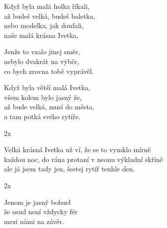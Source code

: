 
\ve
Když byla malá holka říkali, \\
až budeš velká, budeš baletka, \\
nebo modelka, jak doufali,\\
naše malá krásna Ivetka.

\cho
{}Jenže to vzalo jinej směr, \\
nebylo dvakrát na výběr,\\
co bych zrovna tobě vyprávěl. 

\ve
Když byla větší malá Ivetka,\\
všem kolem bylo jasný že, \\
až bude velká, musí do města,\\
a tam potká svého rytíře.

\cho 2x

\ve
{}Velká krásná Ivetka už ví, že se to vymklo mírně\\
každou noc, do rána protaní v neonu výkladní skříně\\
 ale já jsem tady jen,  {š}estej rytíř tenhle den.

\cho 2x

\re{}
Jenom je jasný bohuel\\
že osud není vždycky fér\\
mezi námi na závěr.

\esong